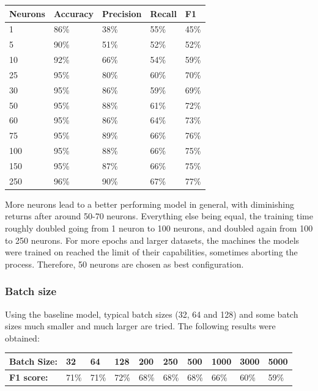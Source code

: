 \documentclass[
a4paper,
pagesize,
pdftex,
12pt,
twoside, %
BCOR=5mm, %
ngerman,
fleqn,
final,
]{scrartcl}
\begin{document}
	\begin{tabular}{ | p{2cm} || p{2cm}|p{2cm}|p{2cm}|p{2cm}|  }
		\hline
		Neurons & Accuracy & Precision & Recall & F1 \\
		\hline
		1 & 86\% & 38\% & 55\% & 45\% \\
		5 & 90\% &  51\% &  52\% &  52\% \\
		10 & 92\% &  66\% &  54\% &  59\% \\
		25 & 95\% &  80\% &  60\% &  70\% \\
		30 & 95\% &  86\% &  59\% &  69\% \\
		50 & 95\% &  88\% &  61\% &  72\% \\
		60 & 95\% &  86\% &  64\% &  73\%\\
		75 & 95\% &  89\% &  66\% &  76\% \\
		100 & 95\% &  88\% &  66\% &  75\% \\
		150 & 95\% &  87\% &  66\% &  75\% \\
		250 & 96\% &  90\% &  67\% &  77\% \\
		\hline
		\hline
	\end{tabular}
	
	More neurons lead to a better performing model in general, with diminishing returns after around 50-70 neurons. Everything else being equal, the training time roughly doubled going from 1 neuron to 100 neurons, and doubled again from 100 to 250 neurons. For more epochs and larger datasets, the machines the models were trained on reached the limit of their capabilities, sometimes aborting the process. Therefore, 50 neurons are chosen as best configuration.
	
	\subsubsection{Batch size}
	Using the baseline model, typical batch sizes (32, 64 and 128) and some batch sizes much smaller and much larger are tried. The following results were obtained: 
	
	\begin{tabular} { | p{3cm} || p{0.8cm} | p{0.8cm}  | p{0.8cm}  |p{0.8cm} | p{0.8cm} | p{0.8cm} | p{0.8cm} | p{0.8cm}| p{0.8cm} |}
		\hline
		\textbf{Batch Size:}  &  32 & 64 & 128 & 200 & 250 & 500 & 1000 & 3000 &5000\\   
		\hline
		\textbf{F1 score:} & 71\% & 71\% & 72\% & 68\% & 68\% & 68\% & 66\% & 60\% & 59\%\\
		\hline
		\hline
	\end{tabular}
	
\end{document}
